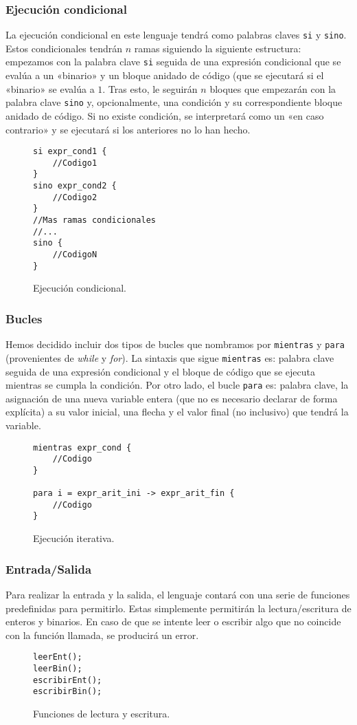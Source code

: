 \subsubsection{Ejecución condicional}
La ejecución condicional en este lenguaje tendrá como palabras claves \lstinline{si} y
\lstinline{sino}. Estos condicionales tendrán $n$ ramas siguiendo la siguiente estructura:
empezamos con la palabra clave \lstinline{si} seguida de una expresión condicional que se
evalúa a un «binario» y un bloque anidado de código (que se ejecutará si el
«binario» se evalúa a $1$. Tras esto, le seguirán $n$ bloques que empezarán con
la palabra clave \lstinline{sino} y, opcionalmente, una condición y su correspondiente
bloque anidado de código. Si no existe condición, se interpretará como un «en
caso contrario» y se ejecutará si los anteriores no lo han hecho.
\begin{figure}[htbp]
    \centering
    \begin{lstlisting}
si expr_cond1 {
    //Codigo1
}
sino expr_cond2 {
    //Codigo2
} 
//Mas ramas condicionales
//...
sino {
    //CodigoN
}
    \end{lstlisting}
    \caption{Ejecución condicional.}
\end{figure}

\subsubsection{Bucles}
Hemos decidido incluir dos tipos de bucles que nombramos por
\lstinline{mientras} y \lstinline{para}
(provenientes de \textit{while} y \textit{for}). La sintaxis que sigue
\lstinline{mientras} es: palabra clave seguida de una expresión condicional y el bloque de
código que se ejecuta mientras se cumpla la condición. Por otro lado, el bucle
\lstinline{para} es: palabra clave, la asignación de una nueva variable entera (que no es
necesario declarar de forma explícita) a su valor inicial, una flecha y el valor
final (no inclusivo) que tendrá la variable.
\begin{figure}[htbp]
    \centering
    \begin{lstlisting}
mientras expr_cond {
    //Codigo
}

para i = expr_arit_ini -> expr_arit_fin {
    //Codigo
}
    \end{lstlisting}
    \caption{Ejecución iterativa.}
\end{figure}

\subsubsection{Entrada/Salida}
Para realizar la entrada y la salida, el lenguaje contará con una serie de
funciones predefinidas para permitirlo. Estas simplemente permitirán la
lectura/escritura de enteros y binarios. En caso de que se intente leer o
escribir algo que no coincide con la función llamada, se producirá un error.
\begin{figure}[htbp]
    \centering
    \begin{lstlisting}
leerEnt();
leerBin();
escribirEnt();
escribirBin();
    \end{lstlisting}
    \caption{Funciones de lectura y escritura.}
\end{figure}

